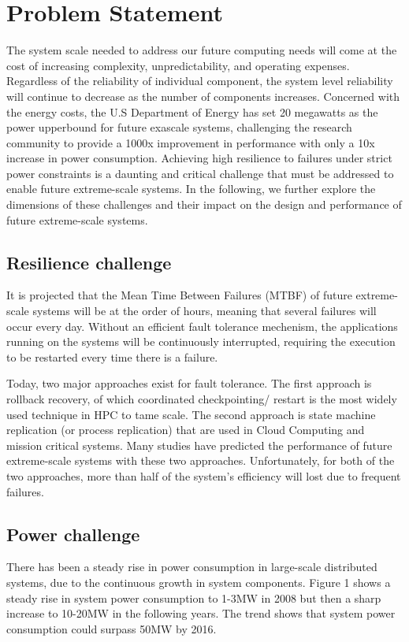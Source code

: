 \section{Problem Statement}

The system scale needed to address our future computing needs will come at the cost of increasing complexity, unpredictability, 
and operating expenses. 
Regardless of the reliability of individual component, the system level reliability will continue to decrease as the number of 
components increases. Concerned with the energy costs, the U.S Department of Energy has set 20 megawatts as the power upperbound 
for future exascale systems, challenging the research community to provide a 1000x improvement in performance with only a 
10x increase in power consumption. 
Achieving high resilience to failures under strict power constraints is a daunting and critical challenge that must be addressed 
to enable future extreme-scale systems. In the following, we further explore the dimensions of these challenges and their impact 
on the design and performance of future extreme-scale systems.

\subsection{Resilience challenge}

It is projected that the Mean Time Between Failures (MTBF) of future extreme-scale systems will be at the order of hours, meaning 
that several failures will occur every day. Without an efficient fault tolerance mechenism, the applications running on the 
systems will be continuously interrupted, requiring the execution to be restarted every time there is a failure. 

Today, two major approaches exist for fault tolerance. The first approach is rollback recovery, of which coordinated checkpointing/
restart is the most widely used technique in HPC to tame scale. The second approach is state machine replication (or process 
replication) that are used in Cloud Computing and mission critical systems. Many studies have predicted the performance of future 
extreme-scale systems with these two approaches. Unfortunately, for both of the two approaches, more than half of  the system's 
efficiency will lost due to frequent failures.  
 
\subsection{Power challenge}
There has been a steady rise in power consumption in large-scale distributed systems, due to the continuous growth in system components. 
Figure 1 shows a steady rise in system power consumption to 1-3MW in 2008 but then a sharp increase to 10-20MW in the following years. The trend shows that system power consumption could surpass 50MW by 2016.


